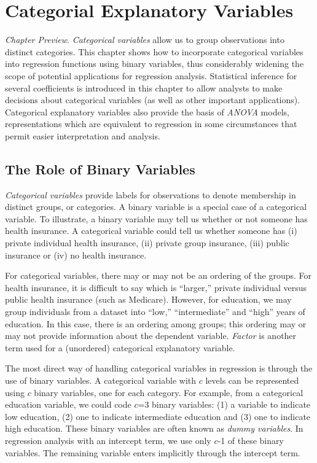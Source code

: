 \setcounter{chapter}{3}

\chapter{Categorial Explanatory Variables}


{\small \textit{Chapter Preview}. \textit{Categorical variables}
allow us to group observations into distinct categories. This
chapter shows how to incorporate categorical variables into
regression functions using binary variables, thus considerably
widening the scope of potential applications for regression
analysis. Statistical inference for several coefficients is
introduced in this chapter to allow analysts to make decisions about
categorical variables (as well as other important applications).
Categorical explanatory variables also provide the basis of
\textit{ANOVA} models, representations which are equivalent to
regression in some circumstances that permit easier interpretation
and analysis.}

\section{The Role of Binary Variables}

\textit{Categorical variables} provide labels for observations to
denote membership in distinct groups, or categories. A binary
variable is a special case of a categorical variable. To illustrate,
a binary variable may tell us whether or not someone has health
insurance. A categorical variable could tell us whether someone has
(i) private individual health insurance, (ii) private group
insurance, (iii) public insurance or (iv) no health insurance.

For categorical variables, there may or may not be an ordering of
the groups. For health insurance, it is difficult to say which is
``larger,'' private individual versus public health insurance (such
as Medicare). However, for education, we may group individuals from
a dataset into ``low,'' ``intermediate'' and ``high'' years of
education. In this case, there is an ordering among groups; this
ordering may or may not provide information about the dependent
variable. \textit{Factor} is another term used for a (unordered)
categorical explanatory variable.

The most direct way of handling categorical variables in regression
is through the use of binary variables. A categorical variable with
$c$ levels can be represented using $c$ binary variables, one for
each category. For example, from a categorical education variable,
we could code $c$=3 binary variables: (1) a variable to indicate low
education, (2) one to indicate intermediate education and (3) one to
indicate high education. These binary variables are often known as
\emph{dummy variables}. In regression analysis with an intercept
term, we use only $c$-1 of these binary variables. The remaining
variable enters implicitly through the intercept term.

